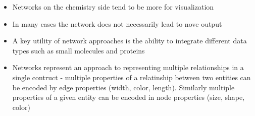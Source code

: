 \documentclass[12pt,letterpaper]{article}
\begin{document}
\begin{itemize}
\item Networks on the chemistry side tend to be more for visualization
\item In many cases the network does not necessarily lead to nove output
\item A key utility of network approaches is the ability to integrate
  different data types such as small molecules and proteins
\item Networks represent an approach to representing multiple
  relationships in a single contruct - multiple properties of a
  relatinship between two entities can be encoded by edge properties
  (width, color, length). Similarly multiple properties of a given
  entity can be encoded in node properties (size, shape, color) 
\end{itemize}

\end{document}
